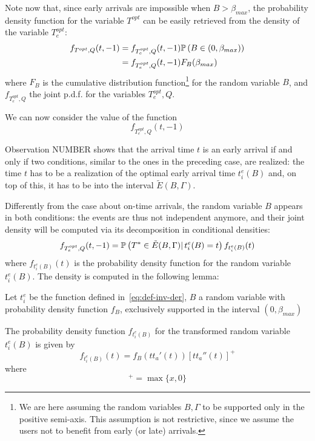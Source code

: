 Note now that, since early arrivals are impossible when \(B > \beta_{max}\),
the probability density function for the variable \(T^{opt}\) can be easily retrieved from the density of the variable \(T_e^{opt}\):
\begin{equation}
  \label{eq:pdf-T_e^opt}
  \begin{split}
    f_{T^{opt}, Q}(t, -1) & = f_{T_e^{opt}, Q}(t, -1) \mathbb{P}\left(B \in (0, \beta_{max})\right) \\
                & = f_{T_e^{opt}, Q}(t, -1) F_B(\beta_{max})
  \end{split}
\end{equation}
where \(F_B\) is the cumulative distribution function\footnote{
  We are here assuming the random variables \(B, \Gamma\) to be supported only in the positive semi-axis.
  This assumption is not restrictive, since we assume the users not to benefit from early (or late) arrivals.
}
for the random variable \(B\),
and \(f_{T_e^{opt}, Q}\) the joint p.d.f. for the variables \(T_e^{opt}, Q\).

We can now consider the value of the function
\begin{equation*}
  f_{T_e^{opt}, Q}(t, -1)
\end{equation*}

Observation NUMBER shows that the arrival time \(t\) is an early arrival if and only if two conditions,
similar to the ones in the preceding case,
are realized:
the time \(t\) has to be a realization of the optimal early arrival time \(t_i^e(B)\) and,
on top of this, it has to be into the interval \(\tilde{E}(B, \Gamma)\).

Differently from the case about on-time arrivals,
the random variable \(B\) appears in both conditions:
the events are thus not independent anymore,
and their joint density will be computed via its decomposition in conditional densities:
\begin{equation}
  \label{eq:late-joint-decomp}
  f_{T_e^{opt}, Q}(t, -1) = \mathbb{P}\left(T^* \in \tilde{E}(B, \Gamma)|\, t_i^e(B) = t\right) f_{t_i^e(B)}(t)
\end{equation}
where \(f_{t_i^e(B)}(t)\) is the probability density function for the random variable \(t_i^e(B)\).
The density is computed in the following lemma:
\begin{lemma}
  \label{lemma:transformed-B}
  Let \(t_i^e\) be the function defined in~\eqref{eq:def-inv-der}, \(B\) a random variable with probability density function \(f_B\),
  exclusively supported in the interval \((0, \beta_{max})\)
  
  The probability density function \(f_{t_i^e(B)}\) for the transformed random variable \(t_i^e(B)\) is given by
  \begin{equation*}
    f_{t_i^e(B)}(t) = f_B(tt_a'(t)) [tt_a''(t)]^+
  \end{equation*}
  where
  \begin{equation*}
    [x]^+ = \max\{x, 0\}
  \end{equation*}
\end{lemma}

